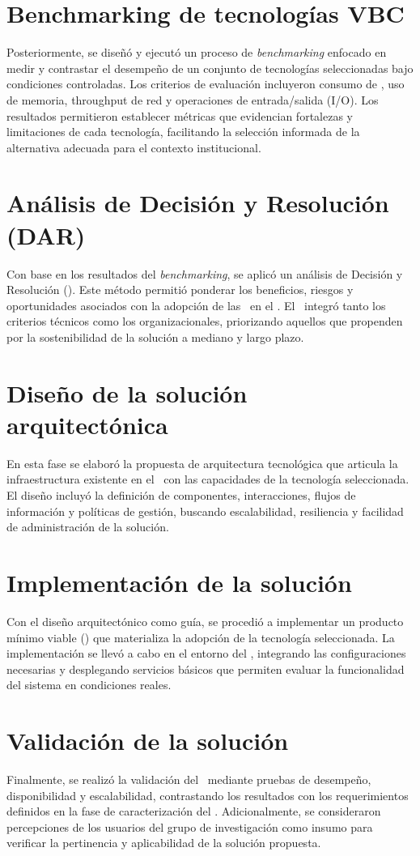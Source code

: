 \section{Benchmarking de tecnologías VBC}
Posteriormente, se diseñó y ejecutó un proceso de \textit{benchmarking} enfocado en medir y contrastar el desempeño de un conjunto de tecnologías seleccionadas bajo condiciones controladas. Los criterios de evaluación incluyeron consumo de \CPU, uso de memoria, throughput de red y operaciones de entrada/salida (I/O). Los resultados permitieron establecer métricas que evidencian fortalezas y limitaciones de cada tecnología, facilitando la selección informada de la alternativa adecuada para el contexto institucional.

\section{Análisis de Decisión y Resolución (DAR)}
Con base en los resultados del \textit{benchmarking}, se aplicó un análisis de Decisión y Resolución (\DAR). Este método permitió ponderar los beneficios, riesgos y oportunidades asociados con la adopción de las \VBC\ en el \GRID. El \DAR\ integró tanto los criterios técnicos como los organizacionales, priorizando aquellos que propenden por la sostenibilidad de la solución a mediano y largo plazo.

\section{Diseño de la solución arquitectónica}
En esta fase se elaboró la propuesta de arquitectura tecnológica que articula la infraestructura existente en el \GRID\ con las capacidades de la tecnología seleccionada. El diseño incluyó la definición de componentes, interacciones, flujos de información y políticas de gestión, buscando escalabilidad, resiliencia y facilidad de administración de la solución.

\section{Implementación de la solución}
Con el diseño arquitectónico como guía, se procedió a implementar un producto mínimo viable (\PMV) que materializa la adopción de la tecnología seleccionada. La implementación se llevó a cabo en el entorno del \GRID, integrando las configuraciones necesarias y desplegando servicios básicos que permiten evaluar la funcionalidad del sistema en condiciones reales.

\section{Validación de la solución}
Finalmente, se realizó la validación del \PMV\ mediante pruebas de desempeño, disponibilidad y escalabilidad, contrastando los resultados con los requerimientos definidos en la fase de caracterización del \GRID. Adicionalmente, se consideraron percepciones de los usuarios del grupo de investigación como insumo para verificar la pertinencia y aplicabilidad de la solución propuesta.